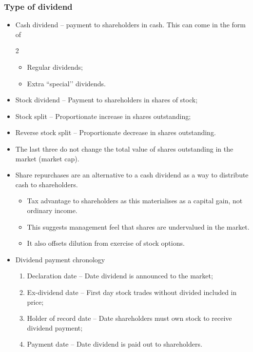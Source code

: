 \documentclass[../notes_compiled.tex]{subfiles}
\begin{document}
\subsubsection{Type of dividend}
\begin{itemize}
\item Cash dividend -- payment to shareholders in cash. This can come in the form of
\begin{multicols}{2}
\begin{itemize}
\item Regular dividends;
\item Extra ``special’’ dividends.
\end{itemize}
\end{multicols}
\item Stock dividend -- Payment to shareholders in shares of stock;
\item Stock split -- Proportionate increase in shares outstanding;
\item Reverse stock split -- Proportionate decrease in shares outstanding.
\item[] The last three do not change the total value of shares outstanding in the market (market cap).

\item Share repurchases are an alternative to a cash dividend as a way to distribute cash to shareholders.
\begin{itemize}
\item Tax advantage to shareholders as this materialises as a capital gain, not ordinary income.
\item This suggests management feel that shares are undervalued in the market.
\item It also offsets dilution from exercise of stock options.
\end{itemize}
\item Dividend payment chronology
\begin{enumerate}
\item Declaration date -- Date dividend is announced to the market;
\item Ex-dividend date -- First day stock trades without divided included in price;
\item Holder of record date -- Date shareholders must own stock to receive dividend payment;
\item Payment date -- Date dividend is paid out to shareholders.
\end{enumerate}
\end{itemize}
\end{document}
